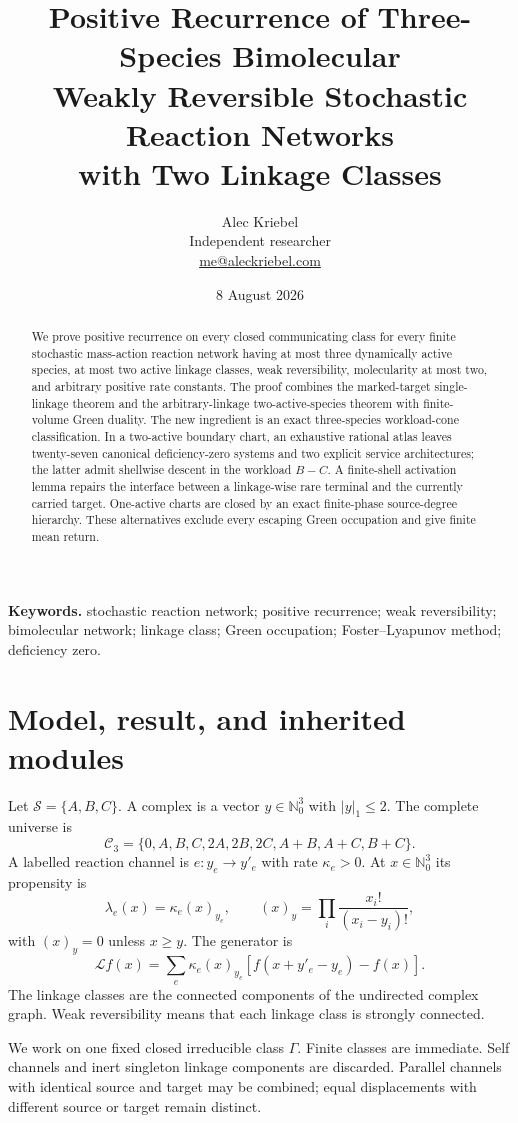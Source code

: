 \documentclass[11pt]{article}
\title{\bfseries Positive Recurrence of Three-Species Bimolecular\\
Weakly Reversible Stochastic Reaction Networks\\with Two Linkage Classes}
\author{Alec Kriebel\\[.2em]\small Independent researcher\\\small\href{mailto:me@aleckriebel.com}{me@aleckriebel.com}}
\date{8 August 2026}
\theoremstyle{definition}\newtheorem{definition}[theorem]{Definition}
\theoremstyle{remark}\newtheorem{remark}[theorem]{Remark}
\begin{document}
\maketitle

\begin{abstract}
We prove positive recurrence on every closed communicating class for every finite stochastic mass-action reaction network having at most three dynamically active species, at most two active linkage classes, weak reversibility, molecularity at most two, and arbitrary positive rate constants.  The proof combines the marked-target single-linkage theorem and the arbitrary-linkage two-active-species theorem with finite-volume Green duality.  The new ingredient is an exact three-species workload-cone classification.  In a two-active boundary chart, an exhaustive rational atlas leaves twenty-seven canonical deficiency-zero systems and two explicit service architectures; the latter admit shellwise descent in the workload $B-C$.  A finite-shell activation lemma repairs the interface between a linkage-wise rare terminal and the currently carried target.  One-active charts are closed by an exact finite-phase source-degree hierarchy.  These alternatives exclude every escaping Green occupation and give finite mean return.
\end{abstract}

\noindent\textbf{Keywords.} stochastic reaction network; positive recurrence; weak reversibility; bimolecular network; linkage class; Green occupation; Foster--Lyapunov method; deficiency zero.

\section{Model, result, and inherited modules}

Let $\mathcal S=\{A,B,C\}$.  A complex is a vector $y\in\mathbb N_0^3$ with $|y|_1\le2$.  The complete universe is
\[
 \mathcal C_3=\{0,A,B,C,2A,2B,2C,A+B,A+C,B+C\}.
\]
A labelled reaction channel is $e:y_e\to y'_e$ with rate $\kappa_e>0$.  At $x\in\mathbb N_0^3$ its propensity is
\[
 \lambda_e(x)=\kappa_e(x)_{y_e},\qquad
 (x)_y=\prod_i\frac{x_i!}{(x_i-y_i)!},
\]
with $(x)_y=0$ unless $x\ge y$.  The generator is
\[
 \mathcal Lf(x)=\sum_e\kappa_e(x)_{y_e}
 [f(x+y'_e-y_e)-f(x)].
\]
The linkage classes are the connected components of the undirected complex graph.  Weak reversibility means that each linkage class is strongly connected.

We work on one fixed closed irreducible class $\Gamma$.  Finite classes are immediate.  Self channels and inert singleton linkage components are discarded.  Parallel channels with identical source and target may be combined; equal displacements with different source or target remain distinct.
\end{document}
